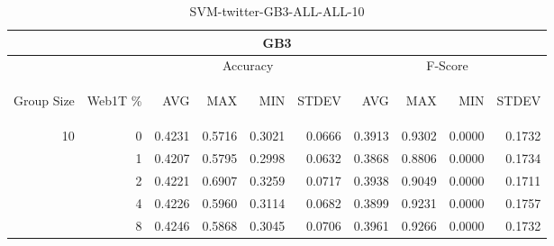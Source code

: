 \begin{center}
\begin{table}[htbp] 
 \begin{center}
\begin{tabular}{ | r | r | r | r | r | r | r | r | r | r |}
\hline
\multicolumn{10}{|c|}{GB3}\\
\hline
 & & \multicolumn{4}{|c|}{Accuracy} & \multicolumn{4}{|c|}{F-Score}\\ \cline{3-10}
\begin{sideways}Group Size\end{sideways} & \begin{sideways}Web1T \%\end{sideways} & \begin{sideways}AVG\end{sideways} & \begin{sideways}MAX\end{sideways} & \begin{sideways}MIN\end{sideways} & \begin{sideways}STDEV\end{sideways} & \begin{sideways}AVG\end{sideways} & \begin{sideways}MAX\end{sideways} & \begin{sideways}MIN\end{sideways} & \begin{sideways}STDEV\end{sideways}\\
\hline
\multirow{4}{*}{10}
 & 0 & 0.4231 & 0.5716 & 0.3021 & 0.0666 & 0.3913 & 0.9302 & 0.0000 & 0.1732\\ \cline{2-10}
 & 1 & 0.4207 & 0.5795 & 0.2998 & 0.0632 & 0.3868 & 0.8806 & 0.0000 & 0.1734\\ \cline{2-10}
 & 2 & 0.4221 & 0.6907 & 0.3259 & 0.0717 & 0.3938 & 0.9049 & 0.0000 & 0.1711\\ \cline{2-10}
 & 4 & 0.4226 & 0.5960 & 0.3114 & 0.0682 & 0.3899 & 0.9231 & 0.0000 & 0.1757\\ \cline{2-10}
 & 8 & 0.4246 & 0.5868 & 0.3045 & 0.0706 & 0.3961 & 0.9266 & 0.0000 & 0.1732\\ \cline{2-10}
\hline
\end{tabular}
\caption{SVM-twitter-GB3-ALL-ALL-10}
\label{table:SVM-twitter-GB3-ALL-ALL-10}
\end{center}
 \end{table}
\end{center}

